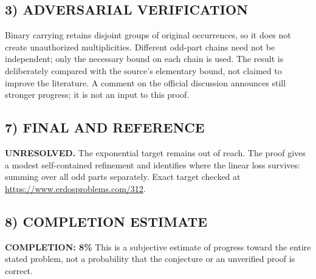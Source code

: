 \subsection*{3) ADVERSARIAL VERIFICATION}
Binary carrying retains disjoint groups of original occurrences, so it
does not create unauthorized multiplicities. Different odd-part chains
need not be independent; only the necessary bound on each chain is used.
The result is deliberately compared with the source's elementary bound,
not claimed to improve the literature. A comment on the official discussion
announces still stronger progress; it is not an input to this proof.

\subsection*{7) FINAL AND REFERENCE}
\textbf{UNRESOLVED.} The exponential target remains out of reach. The proof
gives a modest self-contained refinement and identifies where the linear
loss survives: summing over all odd parts separately.
Exact target checked at \url{https://www.erdosproblems.com/312}.

\subsection*{8) COMPLETION ESTIMATE}
\textbf{COMPLETION: 8\%}
This is a subjective estimate of progress toward the entire stated problem, not a probability that the conjecture or an unverified proof is correct.
